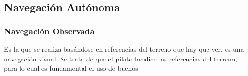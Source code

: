 


\subsection{Navegaci\'on Aut\'onoma}
\label{sec:06.navegacion.autonoma}

\subsubsection{Navegaci\'on Observada }%
\label{sec:06.navegacion.observada}

 Es la que se realiza bas\'andose en
referencias del terreno que hay que ver, es una navegaci\'on visual.
Se trata de que el piloto localice las referencias del terreno, para lo
cual es fundamental el uso de buenos 

